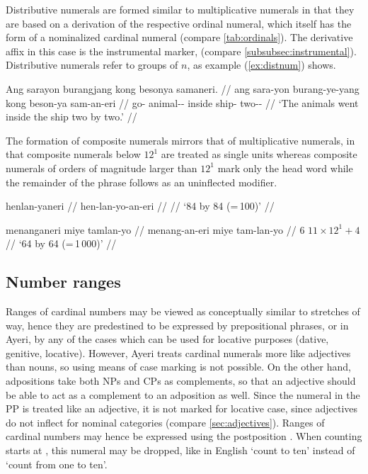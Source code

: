 Distributive numerals are formed similar to multiplicative numerals in that
they are based on a derivation of the respective ordinal numeral, which itself
has  the form of a nominalized cardinal numeral (compare
\autoref{tab:ordinals}). The derivative affix in this case is the
instrumental marker,   (compare
\autoref{subsubsec:instrumental}). Distributive numerals refer to groups of
$n$, as example (\ref{ex:distnum}) shows.

\ex\label{ex:distnum}
\begingl
	\gla Ang sarayon burangjang kong besonya samaneri. //
	\glb ang sara-yon burang-ye-yang kong beson-ya sam-an-eri //
	\glc \AgtT{} go-\TplN{} animal-\Pl{}-\Aarg{} inside ship-\Loc{} 
		two-\Nmlz{}-\Ins{} //
	\glft `The animals went inside the ship two by two.' //
\endgl
\xe

The formation of composite numerals mirrors that of multiplicative numerals, in
that composite numerals below $12^1$ are treated as single units whereas
composite numerals of orders of magnitude larger than $12^1$ mark only the head
word while the remainder of the phrase follows as an uninflected modifier.

\pex
\a\begingl
	\gla henlan-yaneri //
	\glb hen-lan-yo-an-eri //
	 //
	\glft `84 by 84 (=\,100)' //
\endgl

\a\begingl
	\gla menanganeri miye tamlan-yo //
	\glb menang-an-eri miye tam-lan-yo //
	 {$6$} {$11 \times 12^1 + 4$} //
	\glft `6\elv{}4 by 6\elv{}4 (=\,1\,000)' //
\endgl

\xe


\subsection{Number ranges}

Ranges of cardinal numbers may be viewed as conceptually similar to stretches
of way, hence they are predestined to be expressed by prepositional phrases,
or in Ayeri, by any of the cases which can be used for locative purposes
(dative, genitive, locative). However, Ayeri treats cardinal numerals more
like adjectives than nouns, so using means of case marking is not possible. On
the other hand, adpositions take both NPs and CPs as complements, so that an
adjective should be able to act as a complement to an adposition as well.
Since the numeral in the PP is treated like an adjective, it is not marked for
locative case, since adjectives do not inflect for nominal categories (compare
\autoref{sec:adjectives}). Ranges of cardinal numbers may hence be expressed
using the postposition . When counting starts
at , this numeral may be dropped, like in English `count
to ten' instead of `count from one to ten'.

